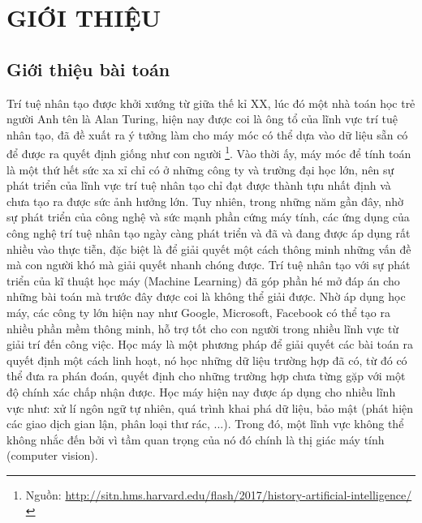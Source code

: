 \chapter{GIỚI THIỆU}
\label{introduction}
\section{Giới thiệu bài toán}
Trí tuệ nhân tạo được khởi xướng từ giữa thế kỉ XX, lúc đó một nhà toán học trẻ người Anh tên là Alan Turing, hiện nay được coi là ông tổ của lĩnh vực trí tuệ nhân tạo, đã đề xuất ra ý tưởng làm cho máy móc có thể dựa vào dữ liệu sẵn có để được ra quyết định giống như con người \footnote{Nguồn: \url{http://sitn.hms.harvard.edu/flash/2017/history-artificial-intelligence/}}. Vào thời ấy, máy móc để tính toán là một thứ hết sức xa xỉ chỉ có ở những công ty và trường đại học lớn, nên sự phát triển của lĩnh vực trí tuệ nhân tạo chỉ đạt được thành tựu nhất định và chưa tạo ra được sức ảnh hưởng lớn. Tuy nhiên, trong những năm gần đây, nhờ sự phát triển của công nghệ và sức mạnh phần cứng máy tính, các ứng dụng của công nghệ trí tuệ nhân tạo ngày càng phát triển và đã và đang được áp dụng rất nhiều vào thực tiễn, đặc biệt là để giải quyết một cách thông minh những vấn đề mà con người khó mà giải quyết nhanh chóng được. Trí tuệ nhân tạo với sự phát triển của kĩ thuật học máy (Machine Learning) đã góp phần hé mở đáp án cho những bài toán mà trước đây được coi là không thể giải được. Nhờ áp dụng học máy, các công ty lớn hiện nay như Google, Microsoft, Facebook có thể tạo ra nhiều phần mềm thông minh, hỗ trợ tốt cho con người trong nhiều lĩnh vực từ giải trí đến công việc. Học máy là một phương pháp để giải quyết các bài toán ra quyết định một cách linh hoạt, nó học những dữ liệu trường hợp đã có, từ đó có thể đưa ra phán đoán, quyết định cho những trường hợp chưa từng gặp với một độ chính xác chấp nhận được. Học máy hiện nay được áp dụng cho nhiều lĩnh vực như: xử lí ngôn ngữ tự nhiên, quá trình khai phá dữ liệu, bảo mật (phát hiện các giao dịch gian lận, phân loại thư rác, ...). Trong đó, một lĩnh vực không thể không nhắc đến bởi vì tầm quan trọng của nó đó chính là thị giác máy tính (computer vision).

